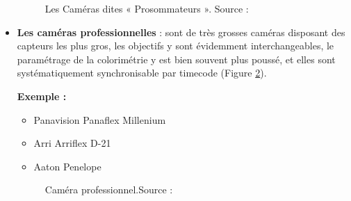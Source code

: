 \begin{itemize}
  \begin{figure}[H]%
  	\center%
  	\setlength{\fboxsep}{5pt}%
  	\setlength{\fboxrule}{0.5pt}%
  \caption[Les Caméras dites « Prosommateurs »]{Les Caméras dites « Prosommateurs ». Source :\cite{noauthor_les_2015}}
  \label{fig:Les Caméras dites « Prosommateurs »}
  \end{figure}
  
 	\item \textbf{Les caméras professionnelles} : sont de très grosses caméras disposant des capteurs les plus gros, les objectifs y sont évidemment interchangeables, le paramétrage de la colorimétrie y est bien souvent plus poussé, et elles sont systématiquement synchronisable par timecode (Figure \ref{fig:Caméras professionnel}).
 	
 	\textbf{Exemple :}
 	
 	\begin{itemize}
 		\item Panavision Panaflex Millenium
 		\item Arri Arriflex D-21
 		\item Aaton Penelope
 	\end{itemize}
 	
 	
 	\begin{figure}[H]%
 		\center%
 		\setlength{\fboxsep}{5pt}%
 		\setlength{\fboxrule}{0.5pt}%
 	\caption[Caméras professionnel]{Caméra  professionnel.Source :\cite{noauthor_les_2015}}
 	\label{fig:Caméras professionnel}
 	\end{figure}
 	

\end{itemize}
